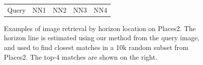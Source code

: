 \begin{figure}[!ht]
\begin{tabular}{c|cccc}
Query & NN1 & NN2 & NN3 & NN4
\end{tabular}
\vspace{1em}
\caption[Examples of image retrieval]{Examples of image retrieval by horizon location on Places2. The horizon line is estimated using our method from the query image, and used to find closest matches in a 10k random subset from Places2. The top-4 matches are shown on the right.}
\label{fig:applications_retrieval}
\end{figure}

